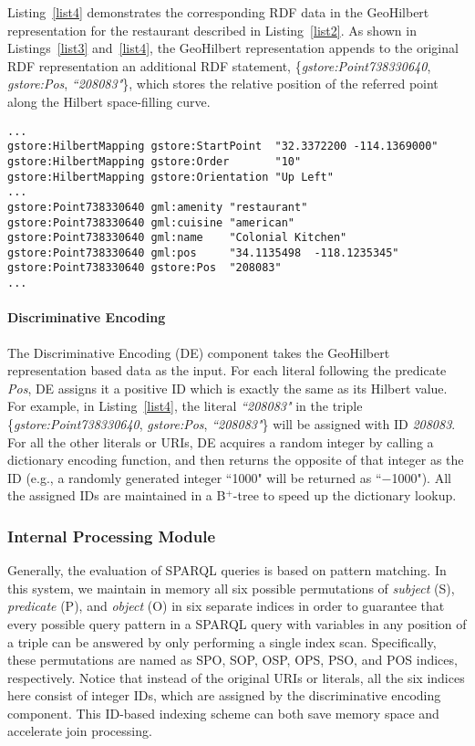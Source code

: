 Listing~\ref{list4} demonstrates the corresponding RDF data in the
GeoHilbert representation for the restaurant described in
Listing~\ref{list2}. As shown in Listings~\ref{list3}
and~\ref{list4}, the GeoHilbert representation appends to the
original RDF representation an additional RDF statement,
\{\emph{gstore:Point738330640}, \emph{gstore:Pos},
\emph{``208083"}\}, which stores the relative position of the
referred point along the Hilbert space-filling curve.


\begin{lstlisting}[caption={The GeoHilbert representation of the restaurant described in Listing~\ref{list2}.}, label={list4}]
...
gstore:HilbertMapping gstore:StartPoint  "32.3372200 -114.1369000"
gstore:HilbertMapping gstore:Order       "10"
gstore:HilbertMapping gstore:Orientation "Up Left"
...
gstore:Point738330640 gml:amenity "restaurant"
gstore:Point738330640 gml:cuisine "american"
gstore:Point738330640 gml:name    "Colonial Kitchen"
gstore:Point738330640 gml:pos     "34.1135498  -118.1235345"
gstore:Point738330640 gstore:Pos  "208083"
...
\end{lstlisting}


\paragraph{Discriminative Encoding}

The Discriminative Encoding (DE) component takes the GeoHilbert
representation based data as the input. For each literal following
the predicate \emph{Pos}, DE assigns it a positive ID which is
exactly the same as its Hilbert value. For example, in
Listing~\ref{list4}, the literal \emph{``208083"} in the triple
\{\emph{gstore:Point738330640}, \emph{gstore:Pos},
\emph{``208083"}\} will be assigned with ID \emph{208083}. For all
the other literals or URIs, DE acquires a random integer by
calling a dictionary encoding function, and then returns the
opposite of that integer as the ID (e.g., a randomly generated
integer ``1000" will be returned as ``$-$1000"). All the assigned
IDs are maintained in a B$^{+}$-tree to speed up the dictionary
lookup.


\subsubsection{Internal Processing Module}

Generally, the evaluation of SPARQL queries is based on pattern
matching. In this system, we maintain in memory all six possible
permutations of \emph{subject} (S), \emph{predicate} (P), and
\emph{object} (O) in six separate indices in order to guarantee
that every possible query pattern in a SPARQL query with variables
in any position of a triple can be answered by only performing a
single index scan. Specifically, these permutations are named as
SPO, SOP, OSP, OPS, PSO, and POS indices, respectively. Notice
that instead of the original URIs or literals, all the six indices
here consist of integer IDs, which are assigned by the
discriminative encoding component. This ID-based indexing scheme
can both save memory space and accelerate join processing.


